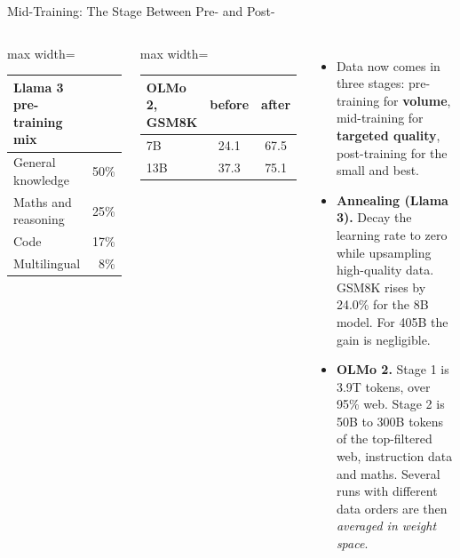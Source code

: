 \begin{frame}{Mid-Training: The Stage Between Pre- and Post-}
    \begin{columns}[T,onlytextwidth]
        \centering
        \small
        \begin{adjustbox}{max width=\linewidth}\begin{tabular}{lr}
            \toprule
            \textbf{Llama 3 pre-training mix} & \\
            \midrule
            General knowledge & 50\% \\
            Maths and reasoning & 25\% \\
            Code & 17\% \\
            Multilingual & 8\% \\
            \bottomrule
        \end{tabular}\end{adjustbox}

        \vspace{0.8em}
        \begin{adjustbox}{max width=\linewidth}\begin{tabular}{lcc}
            \toprule
            \textbf{OLMo 2, GSM8K} & \textbf{before} & \textbf{after} \\
            \midrule
            7B & 24.1 & 67.5 \\
            13B & 37.3 & 75.1 \\
            \bottomrule
        \end{tabular}\end{adjustbox}
        \begin{itemize}\itemsep0.45em
            \item Data now comes in three stages: pre-training for \textbf{volume}, mid-training for \textbf{targeted quality}, post-training for the small and best.
            \item \textbf{Annealing (Llama 3).} Decay the learning rate to zero while upsampling high-quality data. GSM8K rises by 24.0\% for the 8B model. For 405B the gain is negligible.
            \item \textbf{OLMo 2.} Stage 1 is 3.9T tokens, over 95\% web. Stage 2 is 50B to 300B tokens of the top-filtered web, instruction data and maths. Several runs with different data orders are then \emph{averaged in weight space}.
        \end{itemize}
    \end{columns}
    \vspace{0.3em}
\end{frame}


